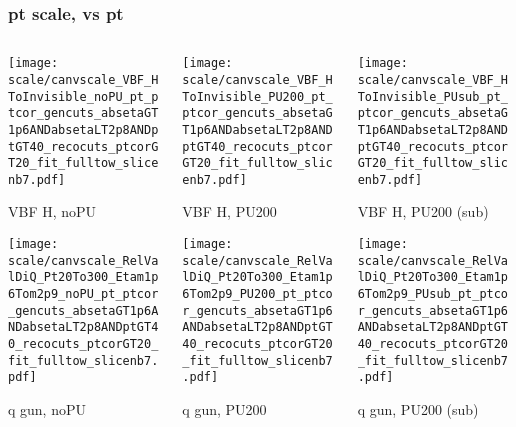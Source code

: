 \documentclass[8pt]{beamer}
\begin{document}
 \begin{frame}
  \frametitle{pt scale, vs pt}
  
  \begin{columns}
   \begin{column}{0.35\textwidth}
     \texttt{[image: scale/canvscale\_VBF\_HToInvisible\_noPU\_pt\_ptcor\_gencuts\_absetaGT1p6ANDabsetaLT2p8ANDptGT40\_recocuts\_ptcorGT20\_fit\_fulltow\_slicenb7.pdf]}
     
     VBF H, noPU
    
     \texttt{[image: scale/canvscale\_RelValDiQ\_Pt20To300\_Etam1p6Tom2p9\_noPU\_pt\_ptcor\_gencuts\_absetaGT1p6ANDabsetaLT2p8ANDptGT40\_recocuts\_ptcorGT20\_fit\_fulltow\_slicenb7.pdf]}
     
     q gun, noPU
   \end{column}
   \begin{column}{0.35\textwidth}
     \texttt{[image: scale/canvscale\_VBF\_HToInvisible\_PU200\_pt\_ptcor\_gencuts\_absetaGT1p6ANDabsetaLT2p8ANDptGT40\_recocuts\_ptcorGT20\_fit\_fulltow\_slicenb7.pdf]}
     
     VBF H, PU200
    
     \texttt{[image: scale/canvscale\_RelValDiQ\_Pt20To300\_Etam1p6Tom2p9\_PU200\_pt\_ptcor\_gencuts\_absetaGT1p6ANDabsetaLT2p8ANDptGT40\_recocuts\_ptcorGT20\_fit\_fulltow\_slicenb7.pdf]}
     
     q gun, PU200
   \end{column}
   \begin{column}{0.35\textwidth}
     \texttt{[image: scale/canvscale\_VBF\_HToInvisible\_PUsub\_pt\_ptcor\_gencuts\_absetaGT1p6ANDabsetaLT2p8ANDptGT40\_recocuts\_ptcorGT20\_fit\_fulltow\_slicenb7.pdf]}
     
     VBF H, PU200 (sub)
    
     \texttt{[image: scale/canvscale\_RelValDiQ\_Pt20To300\_Etam1p6Tom2p9\_PUsub\_pt\_ptcor\_gencuts\_absetaGT1p6ANDabsetaLT2p8ANDptGT40\_recocuts\_ptcorGT20\_fit\_fulltow\_slicenb7.pdf]}
     
     q gun, PU200 (sub)
   \end{column}
  \end{columns}
 \end{frame}
 
\end{document}
